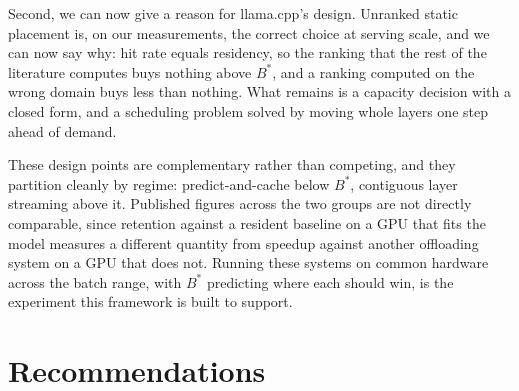 \documentclass[10pt,a4paper]{article}
\begin{document}
Second, we can now give a reason for llama.cpp's design. Unranked static
placement is, on our measurements, the correct choice at serving scale, and we can
now say why: hit rate equals residency, so the ranking that the rest of the
literature computes buys nothing above $B^{*}$, and a ranking computed on the
wrong domain buys less than nothing. What remains is a capacity decision with a
closed form, and a scheduling problem solved by moving whole layers one step ahead
of demand.

These design points are complementary rather than competing, and they partition
cleanly by regime: predict-and-cache below $B^{*}$, contiguous layer streaming
above it. Published figures across the two groups are not directly comparable,
since retention against a resident baseline on a GPU that fits the model measures
a different quantity from speedup against another offloading system on a GPU that
does not. Running these systems on common hardware across the batch range, with
$B^{*}$ predicting where each should win, is the experiment this framework is
built to support.
\section{Recommendations}
\label{sec:recommendations}
\end{document}
